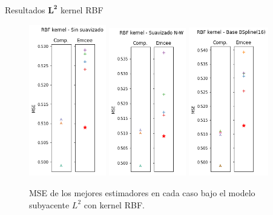 \documentclass[10pt, professionalfonts]{beamer}
\begin{document}
\begin{frame}{Resultados $\boldsymbol{L^2}$ kernel RBF}
  \begin{figure}
    \includegraphics[width=0.3\textwidth]{img/results-new/reg_l2_rbf_none}\hfill
    \includegraphics[width=0.3\textwidth]{img/results-new/reg_l2_rbf_nw}\hfill
    \includegraphics[width=0.31\textwidth]{img/results-new/reg_l2_rbf_basis}
    \caption{MSE de los mejores estimadores en cada caso bajo el modelo subyacente $L^2$ con kernel RBF.}
  \end{figure}
\end{frame}
\end{document}
